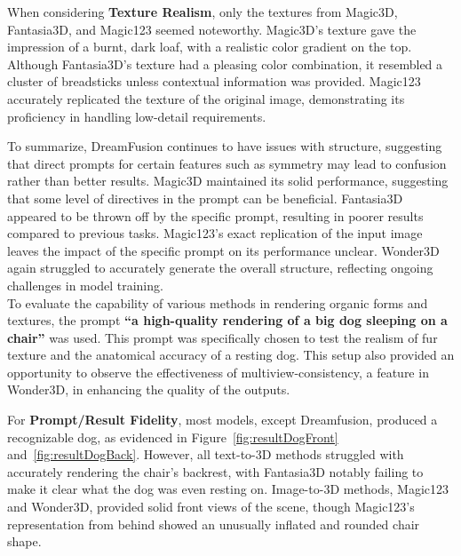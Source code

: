 When considering \textbf{Texture Realism}, only the textures from Magic3D, Fantasia3D, and Magic123 seemed noteworthy. Magic3D's texture gave the impression of a burnt, dark loaf, with a realistic color gradient on the top. Although Fantasia3D's texture had a pleasing color combination, it resembled a cluster of breadsticks unless contextual information was provided. Magic123 accurately replicated the texture of the original image, demonstrating its proficiency in handling low-detail requirements.

To summarize, DreamFusion continues to have issues with structure, suggesting that direct prompts for certain features such as symmetry may lead to confusion rather than better results. Magic3D maintained its solid performance, suggesting that some level of directives in the prompt can be beneficial. Fantasia3D appeared to be thrown off by the specific prompt, resulting in poorer results compared to previous tasks. Magic123's exact replication of the input image leaves the impact of the specific prompt on its performance unclear. Wonder3D again struggled to accurately generate the overall structure, reflecting ongoing challenges in model training.\\





To evaluate the capability of various methods in rendering organic forms and textures, the prompt \textbf{``a high-quality rendering of a big dog sleeping on a chair''} was used. This prompt was specifically chosen to test the realism of fur texture and the anatomical accuracy of a resting dog. This setup also provided an opportunity to observe the effectiveness of multiview-consistency, a feature in Wonder3D, in enhancing the quality of the outputs.

For \textbf{Prompt/Result Fidelity}, most models, except Dreamfusion, produced a recognizable dog, as evidenced in Figure~\ref{fig:resultDogFront} and~\ref{fig:resultDogBack}. However, all text-to-3D methods struggled with accurately rendering the chair's backrest, with Fantasia3D notably failing to make it clear what the dog was even resting on. Image-to-3D methods, Magic123 and Wonder3D, provided solid front views of the scene, though Magic123's representation from behind showed an unusually inflated and rounded chair shape.

